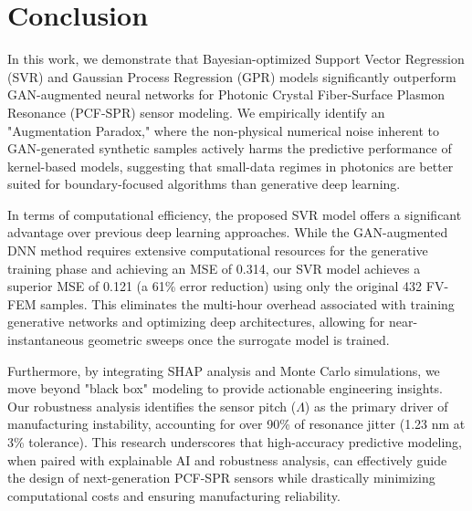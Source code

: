 \documentclass[conference]{IEEEtran}
\begin{document}
\section{Conclusion}
In this work, we demonstrate that Bayesian-optimized Support Vector Regression (SVR) and Gaussian Process Regression (GPR) models significantly outperform GAN-augmented neural networks for Photonic Crystal Fiber-Surface Plasmon Resonance (PCF-SPR) sensor modeling. We empirically identify an "Augmentation Paradox," where the non-physical numerical noise inherent to GAN-generated synthetic samples actively harms the predictive performance of kernel-based models, suggesting that small-data regimes in photonics are better suited for boundary-focused algorithms than generative deep learning. 

In terms of computational efficiency, the proposed SVR model offers a significant advantage over previous deep learning approaches. While the GAN-augmented DNN method \cite{b1} requires extensive computational resources for the generative training phase and achieving an MSE of 0.314, our SVR model achieves a superior MSE of 0.121 (a 61\% error reduction) using only the original 432 FV-FEM samples. This eliminates the multi-hour overhead associated with training generative networks and optimizing deep architectures, allowing for near-instantaneous geometric sweeps once the surrogate model is trained.

Furthermore, by integrating SHAP analysis and Monte Carlo simulations, we move beyond "black box" modeling to provide actionable engineering insights. Our robustness analysis identifies the sensor pitch ($\Lambda$) as the primary driver of manufacturing instability, accounting for over 90\% of resonance jitter (1.23 nm at 3\% tolerance). This research underscores that high-accuracy predictive modeling, when paired with explainable AI and robustness analysis, can effectively guide the design of next-generation PCF-SPR sensors while drastically minimizing computational costs and ensuring manufacturing reliability.
\end{document}
